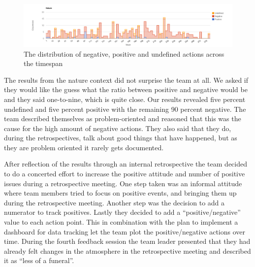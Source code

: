 \begin{table}[!h]
	\begin{center}
	\caption{Analysis results from the content analysis for the nature of the action.}
	\label{table:nature-results}
	\end{center}
\end{table}

\begin{figure}
	\centering
	\includegraphics[width=\textwidth, keepaspectratio]{figures/nature-l.png}
	\caption{The distribution of negative, positive and undefined actions across the timespan}
	\label{figure:nature-l}
\end{figure}
\afterpage{\clearpage}

The results from the nature context did not surprise the team at all. We asked if they would like the guess what the ratio between positive and negative would be and they said one-to-nine, which is quite close. Our results revealed five percent undefined and five percent positive with the remaining 90 percent negative. The team described themselves as problem-oriented and reasoned that this was the cause for the high amount of negative actions. They also said that they do, during the retrospectives, talk about good things that have happened, but as they are problem oriented it rarely gets documented. 

After reflection of the results through an internal retrospective the team decided to do a concerted effort to increase the positive attitude and number of positive issues during a retrospective meeting. One step taken was an informal attitude where team members tried to focus on positive events, and bringing them up during the retrospective meeting. Another step was the decision to add a numerator to track positives. Lastly they decided to add a ``positive/negative'' value to each action point. This in combination with the plan to implement a dashboard for data tracking let the team plot the positive/negative actions over time. During the fourth feedback session the team leader presented that they had already felt changes in the atmosphere in the retrospective meeting and described it as ``less of a funeral''. 

